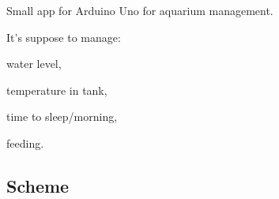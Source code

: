 Small app for Arduino Uno for aquarium management.

It's suppose to manage\+:
\begin{DoxyItemize}
\item water level,
\item temperature in tank,
\item time to sleep/morning,
\item feeding.
\end{DoxyItemize}

\subsection*{Scheme}

 